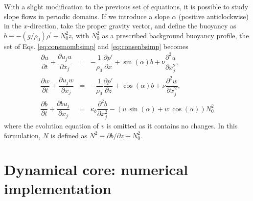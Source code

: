 \documentclass[gmd,manuscript]{copernicus}
\begin{document}
With a slight modification to the previous set of equations, it is possible to study slope flows in periodic domains. If we introduce a slope $\alpha$ (positive anticlockwise) in the $x$-direction, take the proper gravity vector, and define the buoyancy as $b \equiv -(g/\rho_0)\rho^\prime - N_0^2 z$, with $N_0^2$ as a prescribed background buoyancy profile, the set of Eqs. \ref{eq:consmombsimp} and \ref{eq:consenbsimp} becomes
\begin{eqnarray}
\dfrac{\partial u}{\partial t} + \dfrac{\partial u_j u}{\partial x_j} & = & 
- \dfrac{1}{\rho_0}\dfrac{\partial p'}{\partial x} + \sin(\alpha) b + \nu \dfrac{\partial^2 u}{\partial x_j^2}\label{eq:consuslope},\\
\dfrac{\partial w}{\partial t} + \dfrac{\partial u_j w}{\partial x_j} & = & 
- \dfrac{1}{\rho_0}\dfrac{\partial p'}{\partial z} + \cos(\alpha) b + \nu \dfrac{\partial^2 w}{\partial x_j^2}\label{eq:conswslope},\\
\dfrac{\partial b}{\partial t} + \dfrac{\partial b u_j}{\partial x_j} & = & 
\kappa_b \dfrac{\partial^2 b}{\partial x_j^2} - \left (u\,\sin(\alpha) + w\,\cos(\alpha) \right) N_0^2\label{eq:consbslope}
\end{eqnarray}
where the evolution equation of $v$ is omitted as it contains no changes. In this formulation, $N$ is defined as $N^2 \equiv \partial b/\partial z + N_0^2$.

\section{Dynamical core: numerical implementation}\label{sec:dyncorediscrete}
\end{document}
